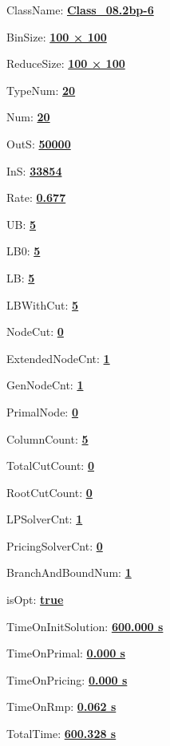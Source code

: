 \documentclass[11pt]{article}
\begin{document}
\pagestyle{empty}


ClassName: \underline{\textbf{Class_08.2bp-6}}
\par
BinSize: \underline{\textbf{100 × 100}}
\par
ReduceSize: \underline{\textbf{100 × 100}}
\par
TypeNum: \underline{\textbf{20}}
\par
Num: \underline{\textbf{20}}
\par
OutS: \underline{\textbf{50000}}
\par
InS: \underline{\textbf{33854}}
\par
Rate: \underline{\textbf{0.677}}
\par
UB: \underline{\textbf{5}}
\par
LB0: \underline{\textbf{5}}
\par
LB: \underline{\textbf{5}}
\par
LBWithCut: \underline{\textbf{5}}
\par
NodeCut: \underline{\textbf{0}}
\par
ExtendedNodeCnt: \underline{\textbf{1}}
\par
GenNodeCnt: \underline{\textbf{1}}
\par
PrimalNode: \underline{\textbf{0}}
\par
ColumnCount: \underline{\textbf{5}}
\par
TotalCutCount: \underline{\textbf{0}}
\par
RootCutCount: \underline{\textbf{0}}
\par
LPSolverCnt: \underline{\textbf{1}}
\par
PricingSolverCnt: \underline{\textbf{0}}
\par
BranchAndBoundNum: \underline{\textbf{1}}
\par
isOpt: \underline{\textbf{true}}
\par
TimeOnInitSolution: \underline{\textbf{600.000 s}}
\par
TimeOnPrimal: \underline{\textbf{0.000 s}}
\par
TimeOnPricing: \underline{\textbf{0.000 s}}
\par
TimeOnRmp: \underline{\textbf{0.062 s}}
\par
TotalTime: \underline{\textbf{600.328 s}}
\par
\newpage


\end{document}
